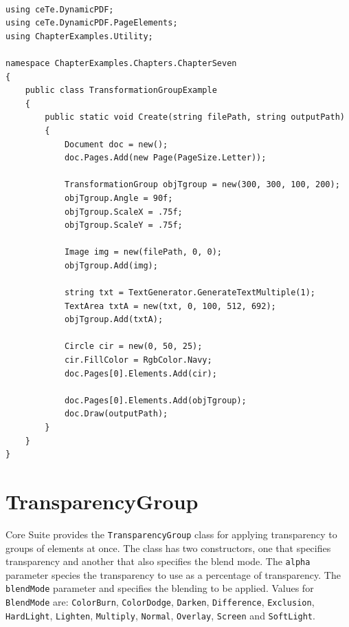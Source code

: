 \documentclass[american]{tufte-book}
\numberwithin{equation}{section}
\numberwithin{figure}{section}
\begin{document}
{\bgroup{}
\begin{lstlisting}[caption={Applying a TransformationGroup.},label={lis:Applying-a-TransformationGroup},basicstyle={\footnotesize\ttfamily},breaklines=true]

using ceTe.DynamicPDF;
using ceTe.DynamicPDF.PageElements;
using ChapterExamples.Utility;

namespace ChapterExamples.Chapters.ChapterSeven
{
    public class TransformationGroupExample
    {
        public static void Create(string filePath, string outputPath)
        {
            Document doc = new();
            doc.Pages.Add(new Page(PageSize.Letter));

            TransformationGroup objTgroup = new(300, 300, 100, 200);
            objTgroup.Angle = 90f;
            objTgroup.ScaleX = .75f;
            objTgroup.ScaleY = .75f;

            Image img = new(filePath, 0, 0);
            objTgroup.Add(img);

            string txt = TextGenerator.GenerateTextMultiple(1);
            TextArea txtA = new(txt, 0, 100, 512, 692);
            objTgroup.Add(txtA);

            Circle cir = new(0, 50, 25);
            cir.FillColor = RgbColor.Navy;
            doc.Pages[0].Elements.Add(cir);

            doc.Pages[0].Elements.Add(objTgroup);
            doc.Draw(outputPath);
        }
    }
}
\end{lstlisting}
\leavevmode\egroup


\section{TransparencyGroup}\label{subsec:TransparencyGroup}

Core Suite provides the \texttt{TransparencyGroup} class for applying
transparency to groups of elements at once. The class has two constructors,
one that specifies transparency and another that also specifies the
blend mode. The \texttt{alpha} parameter species the transparency
to use as a percentage of transparency. The \texttt{blendMode} parameter
and specifies the blending to be applied. Values for \texttt{BlendMode}
are: \texttt{ColorBurn}, \texttt{ColorDodge}, \texttt{Darken}, \texttt{Difference},
\texttt{Exclusion}, \texttt{HardLight}, \texttt{Lighten}, \texttt{Multiply},
\texttt{Normal}, \texttt{Overlay}, \texttt{Screen} and \texttt{SoftLight}.

}
\end{document}
